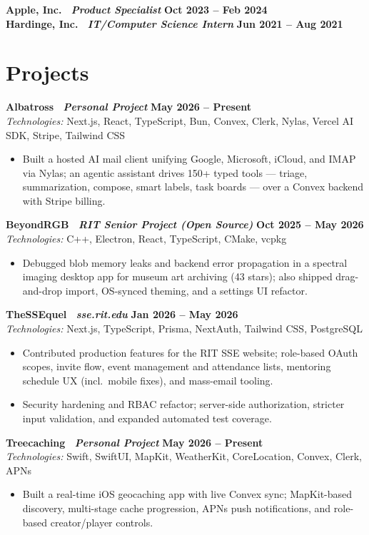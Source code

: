 \documentclass[10pt]{article}
\newcommand{\Role}[1]{{\youngserif\bfseries #1}}
\newcommand{\EntryGap}{\vspace{1.5pt}}
\newcommand{\ResumeSection}[1]{\Needspace{3\baselineskip}\section*{#1}}
\newcommand{\Meta}[1]{{\youngserif\textbar{}\ \itshape\color{Slate}#1}}
\newcommand{\Date}[1]{{\youngserif\bfseries #1}}
\newcommand{\Tech}[1]{{\itshape Technologies:} #1}
\newcommand{\Action}[1]{{\color{Accent}#1}}
\begin{document}
{\Role{Apple, Inc. \Meta{Product Specialist}}} \hfill \Date{Oct 2023 -- Feb 2024} \\
{\Role{Hardinge, Inc. \Meta{IT/Computer Science Intern}}} \hfill \Date{Jun 2021 -- Aug 2021}

\ResumeSection{Projects}
{\Role{Albatross \Meta{Personal Project}}} \hfill \Date{May 2026 -- Present} \\
\Tech{Next.js, React, TypeScript, Bun, Convex, Clerk, Nylas, Vercel AI SDK, Stripe, Tailwind CSS}
\begin{itemize}
  \item Built a \Action{hosted AI mail client} unifying Google, Microsoft, iCloud, and IMAP via Nylas; an agentic assistant drives \Action{150+ typed tools} — triage, summarization, compose, smart labels, task boards — over a Convex backend with Stripe billing.
\end{itemize}
\EntryGap

{\Role{BeyondRGB \Meta{RIT Senior Project (Open Source)}}} \hfill \Date{Oct 2025 -- May 2026} \\
\Tech{C++, Electron, React, TypeScript, CMake, vcpkg}
\begin{itemize}
  \item Debugged \Action{blob memory leaks and backend error propagation} in a spectral imaging desktop app for museum art archiving (\Action{43 stars}); also shipped drag-and-drop import, OS-synced theming, and a settings UI refactor.
\end{itemize}
\EntryGap

{\Role{TheSSEquel \Meta{sse.rit.edu}}} \hfill \Date{Jan 2026 -- May 2026} \\
\Tech{Next.js, TypeScript, Prisma, NextAuth, Tailwind CSS, PostgreSQL}
\begin{itemize}
  \item Contributed \Action{production features} for the RIT SSE website; \Action{role-based OAuth scopes}, invite flow, event management and attendance lists, mentoring schedule UX (incl.\ mobile fixes), and mass-email tooling.
  \item \Action{Security hardening and RBAC refactor}; server-side authorization, stricter input validation, and expanded automated test coverage.
\end{itemize}
\EntryGap

{\Role{Treecaching \Meta{Personal Project}}} \hfill \Date{May 2026 -- Present} \\
\Tech{Swift, SwiftUI, MapKit, WeatherKit, CoreLocation, Convex, Clerk, APNs}
\begin{itemize}
  \item Built a \Action{real-time iOS geocaching app} with \Action{live Convex sync}; MapKit-based discovery, multi-stage cache progression, APNs push notifications, and role-based creator/player controls.
\end{itemize}
\end{document}
